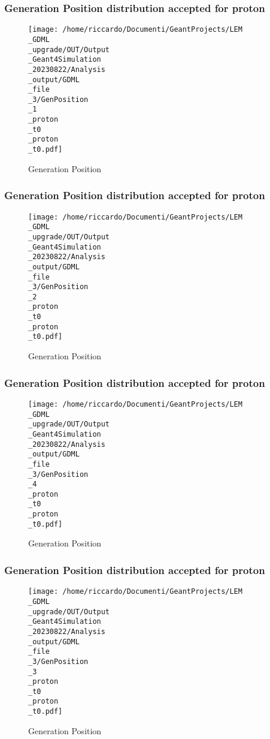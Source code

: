\documentclass[8pt]{beamer}
\begin{document}
            \begin{frame}
                \frametitle{Generation Position distribution accepted for proton}
            
        \begin{figure}[h]
            \centering
            \texttt{[image: /home/riccardo/Documenti/GeantProjects/LEM\\\_GDML\\\_upgrade/OUT/Output\\\_Geant4Simulation\\\_20230822/Analysis\\\_output/GDML\\\_file\\\_3/GenPosition\\\_1\\\_proton\\\_t0\\\_proton\\\_t0.pdf]}
            \caption{Generation Position}
        \end{figure}
        
            \end{frame}
            
            \begin{frame}
                \frametitle{Generation Position distribution accepted for proton}
            
        \begin{figure}[h]
            \centering
            \texttt{[image: /home/riccardo/Documenti/GeantProjects/LEM\\\_GDML\\\_upgrade/OUT/Output\\\_Geant4Simulation\\\_20230822/Analysis\\\_output/GDML\\\_file\\\_3/GenPosition\\\_2\\\_proton\\\_t0\\\_proton\\\_t0.pdf]}
            \caption{Generation Position}
        \end{figure}
        
            \end{frame}
            
            \begin{frame}
                \frametitle{Generation Position distribution accepted for proton}
            
        \begin{figure}[h]
            \centering
            \texttt{[image: /home/riccardo/Documenti/GeantProjects/LEM\\\_GDML\\\_upgrade/OUT/Output\\\_Geant4Simulation\\\_20230822/Analysis\\\_output/GDML\\\_file\\\_3/GenPosition\\\_4\\\_proton\\\_t0\\\_proton\\\_t0.pdf]}
            \caption{Generation Position}
        \end{figure}
        
            \end{frame}
            
            \begin{frame}
                \frametitle{Generation Position distribution accepted for proton}
            
        \begin{figure}[h]
            \centering
            \texttt{[image: /home/riccardo/Documenti/GeantProjects/LEM\\\_GDML\\\_upgrade/OUT/Output\\\_Geant4Simulation\\\_20230822/Analysis\\\_output/GDML\\\_file\\\_3/GenPosition\\\_3\\\_proton\\\_t0\\\_proton\\\_t0.pdf]}
            \caption{Generation Position}
        \end{figure}
        
            \end{frame}
            
\end{document}
